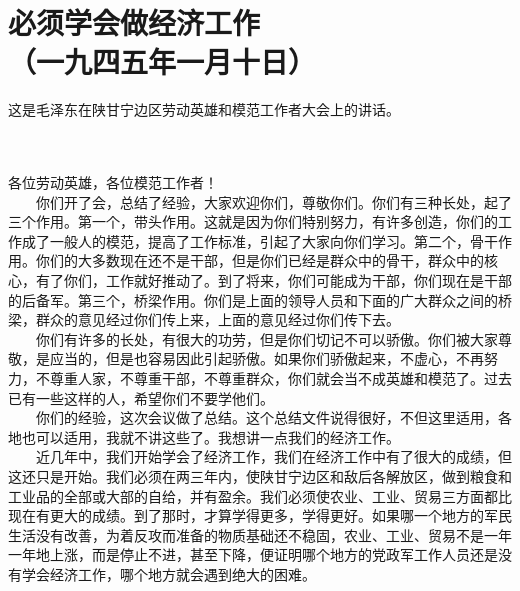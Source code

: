 \documentclass[cn,11pt,chinese]{elegantbook}
\def\myformat#1{\hfil\hfil #1}
\begin{document}
\newpage\section*{\myformat{必须学会做经济工作}\\\myformat{（一九四五年一月十日）}}
\begin{introduction}\item  这是毛泽东在陕甘宁边区劳动英雄和模范工作者大会上的讲话。\end{introduction}
\\~\\
各位劳动英雄，各位模范工作者！\\
　　你们开了会，总结了经验，大家欢迎你们，尊敬你们。你们有三种长处，起了三个作用。第一个，带头作用。这就是因为你们特别努力，有许多创造，你们的工作成了一般人的模范，提高了工作标准，引起了大家向你们学习。第二个，骨干作用。你们的大多数现在还不是干部，但是你们已经是群众中的骨干，群众中的核心，有了你们，工作就好推动了。到了将来，你们可能成为干部，你们现在是干部的后备军。第三个，桥梁作用。你们是上面的领导人员和下面的广大群众之间的桥梁，群众的意见经过你们传上来，上面的意见经过你们传下去。\\
　　你们有许多的长处，有很大的功劳，但是你们切记不可以骄傲。你们被大家尊敬，是应当的，但是也容易因此引起骄傲。如果你们骄傲起来，不虚心，不再努力，不尊重人家，不尊重干部，不尊重群众，你们就会当不成英雄和模范了。过去已有一些这样的人，希望你们不要学他们。\\
　　你们的经验，这次会议做了总结。这个总结文件说得很好，不但这里适用，各地也可以适用，我就不讲这些了。我想讲一点我们的经济工作。\\
　　近几年中，我们开始学会了经济工作，我们在经济工作中有了很大的成绩，但这还只是开始。我们必须在两三年内，使陕甘宁边区和敌后各解放区，做到粮食和工业品的全部或大部的自给，并有盈余。我们必须使农业、工业、贸易三方面都比现在有更大的成绩。到了那时，才算学得更多，学得更好。如果哪一个地方的军民生活没有改善，为着反攻而准备的物质基础还不稳固，农业、工业、贸易不是一年一年地上涨，而是停止不进，甚至下降，便证明哪个地方的党政军工作人员还是没有学会经济工作，哪个地方就会遇到绝大的困难。\\
\end{document}
